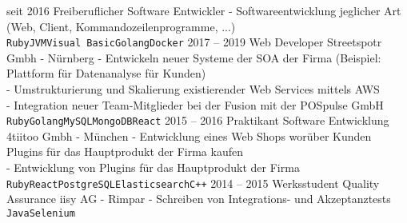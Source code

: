 \documentclass[9pt]{../developercv} %
\begin{document}


\begin{entrylist}
	\entry
		{seit 2016}
		{Freiberuflicher Software Entwickler}
		{}
		{- Softwareentwicklung jeglicher Art (Web, Client, Kommandozeilenprogramme, ...)\\
                 \texttt{Ruby}\slashsep\texttt{JVM}\slashsep\texttt{Visual Basic}\slashsep\texttt{Golang}\slashsep\texttt{Docker}}
	\entry
		{2017 -- 2019}
		{Web Developer}
		{Streetspotr Gmbh - Nürnberg}
		{- Entwickeln neuer Systeme der SOA der Firma (Beispiel: Plattform für Datenanalyse für Kunden)\\
                 - Umstrukturierung und Skalierung existierender Web Services mittels AWS\\
                 - Integration neuer Team-Mitglieder bei der Fusion mit der POSpulse GmbH\\
                 \texttt{Ruby}\slashsep\texttt{Golang}\slashsep\texttt{MySQL}\slashsep\texttt{MongoDB}\slashsep\texttt{React}}
	\entry
		{2015 -- 2016}
		{Praktikant Software Entwicklung}
		{4tiitoo Gmbh - München}
		{- Entwicklung eines Web Shops worüber Kunden Plugins für das Hauptprodukt der Firma kaufen\\
                 - Entwicklung von Plugins für das Hauptprodukt der Firma\\
                 \texttt{Ruby}\slashsep\texttt{React}\slashsep\texttt{PostgreSQL}\slashsep\texttt{Elasticsearch}\slashsep\texttt{C++}}
	\entry
		{2014 -- 2015}
		{Werksstudent Quality Assurance}
		{iisy AG - Rimpar}
		{- Schreiben von Integrations- und Akzeptanztests\\
                 \texttt{Java}\slashsep\texttt{Selenium}}
\end{entrylist}

\end{document}
